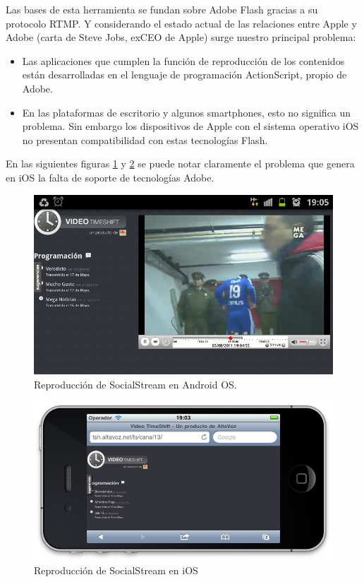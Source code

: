 Las bases de esta herramienta se fundan sobre Adobe Flash gracias a su protocolo RTMP. Y considerando el estado actual de las relaciones entre Apple y Adobe (carta de Steve Jobs, exCEO de Apple) surge nuestro principal problema:

\begin{itemize}
\item Las aplicaciones que cumplen la función de reproducción de los contenidos están desarrolladas en el lenguaje de programación ActionScript, propio de Adobe.
\item En las plataformas de escritorio y algunos smartphones, esto no significa un problema. Sin embargo los dispositivos de Apple con el sistema operativo iOS no presentan compatibilidad con estas tecnologías Flash.
\end{itemize}

	En las siguientes figuras \ref{sshot_Android_sstream} y \ref{sshot_iOS_sstream} se puede notar claramente el problema que genera en iOS la falta de soporte de tecnologías Adobe.

\begin{figure}[h!]
	\centering
	 \includegraphics[scale=0.47]{imgs/sshot_Android_sstream.jpg}
 	\caption{Reproducción de SocialStream en Android OS.}
	\label{sshot_Android_sstream}
\end{figure}
\begin{figure}[h!]
	\centering
	\includegraphics[scale=0.55]{imgs/sshot_iOS_sstream.png}
	\caption{Reproducción de SocialStream en iOS}
	\label{sshot_iOS_sstream}
\end{figure}

